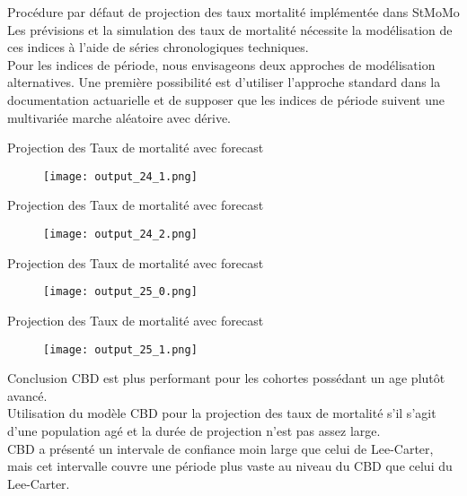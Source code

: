 \documentclass[11pt]{beamer}
\begin{document}
\begin{frame}{Procédure par défaut de projection des taux mortalité implémentée dans StMoMo}
Les prévisions et la simulation des taux de mortalité nécessite la modélisation de ces indices à l’aide de séries chronologiques techniques. 
\\Pour les indices de période, nous envisageons deux approches de modélisation alternatives. Une première possibilité est d’utiliser l’approche standard dans la documentation actuarielle et de supposer que les indices de période suivent une multivariée marche aléatoire avec dérive.
\end{frame}

\begin{frame}{Projection des Taux de mortalité avec forecast}
\begin{figure}[!htb]
    \centering
    \texttt{[image: output\_24\_1.png]}
\end{figure}
\end{frame}

\begin{frame}{Projection des Taux de mortalité avec forecast}
\begin{figure}[!htb]
    \centering
    \texttt{[image: output\_24\_2.png]}
\end{figure}
\end{frame}

\begin{frame}{Projection des Taux de mortalité avec forecast}
\begin{figure}[!htb]
    \centering
    \texttt{[image: output\_25\_0.png]}
\end{figure}
\end{frame}

\begin{frame}{Projection des Taux de mortalité avec forecast}
\begin{figure}[!htb]
    \centering
    \texttt{[image: output\_25\_1.png]}
\end{figure}
\end{frame}

\begin{frame}{Conclusion}
CBD est plus performant pour les cohortes possédant un age plutôt avancé. 
\\Utilisation du modèle CBD pour la projection des taux de mortalité s'il s'agit d'une population agé et la durée de projection n'est pas assez large.
\\CBD a présenté un intervale de confiance moin large que celui de Lee-Carter, mais cet intervalle couvre une période plus vaste au niveau du CBD que celui du Lee-Carter.
\end{frame}
\end{document}
